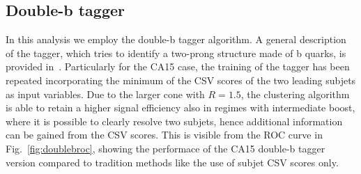









\subsection{Double-b tagger}

In this analysis we employ the double-b tagger algorithm. A general description of the tagger, which tries to identify a two-prong structure made of b quarks, is provided in~\cite{CMS-PAS-BTV-15-002}. Particularly for the CA15 case, the training of the tagger has been repeated incorporating the minimum of the CSV scores of the two leading subjets as input variables. Due to the larger cone with $R=1.5$, the clustering algorithm is able to retain a higher signal efficiency also in regimes with intermediate boost, where it is possible to clearly resolve two subjets, hence additional information can be gained from the CSV scores. This is visible from the ROC curve in Fig.~\ref{fig:doublebroc}, showing the performace of the CA15 double-b tagger version compared to tradition methods like the use of subjet CSV scores only.


